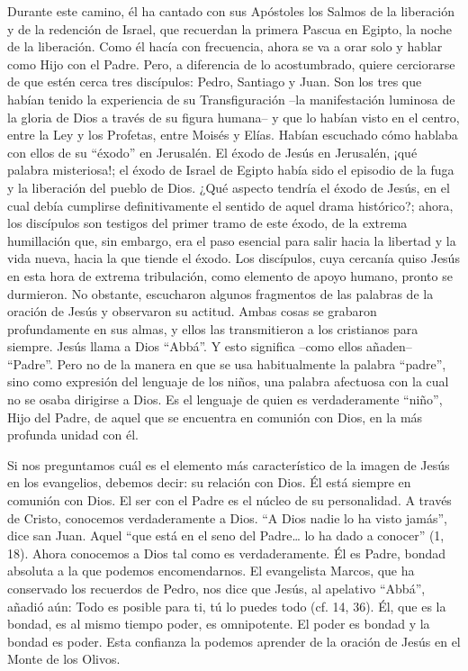 			\begin{body}Durante este camino, él ha cantado con sus Apóstoles los Salmos de la liberación y de la redención de Israel, que recuerdan la primera Pascua en Egipto, la noche de la liberación. Como él hacía con frecuencia, ahora se va a orar solo y hablar como Hijo con el Padre. Pero, a diferencia de lo acostumbrado, quiere cerciorarse de que estén cerca tres discípulos: Pedro, Santiago y Juan. Son los tres que habían tenido la experiencia de su Transfiguración –la manifestación luminosa de la gloria de Dios a través de su figura humana– y que lo habían visto en el centro, entre la Ley y los Profetas, entre Moisés y Elías. Habían escuchado cómo hablaba con ellos de su “éxodo” en Jerusalén. El éxodo de Jesús en Jerusalén, ¡qué palabra misteriosa!; el éxodo de Israel de Egipto había sido el episodio de la fuga y la liberación del pueblo de Dios. ¿Qué aspecto tendría el éxodo de Jesús, en el cual debía cumplirse definitivamente el sentido de aquel drama histórico?; ahora, los discípulos son testigos del primer tramo de este éxodo, de la extrema humillación que, sin embargo, era el paso esencial para salir hacia la libertad y la vida nueva, hacia la que tiende el éxodo. Los discípulos, cuya cercanía quiso Jesús en esta hora de extrema tribulación, como elemento de apoyo humano, pronto se durmieron. No obstante, escucharon algunos fragmentos de las palabras de la oración de Jesús y observaron su actitud. Ambas cosas se grabaron profundamente en sus almas, y ellos las transmitieron a los cristianos para siempre. Jesús llama a Dios “Abbá”. Y esto significa –como ellos añaden– “Padre”. Pero no de la manera en que se usa habitualmente la palabra “padre”, sino como expresión del lenguaje de los niños, una palabra afectuosa con la cual no se osaba dirigirse a Dios. Es el lenguaje de quien es verdaderamente “niño”, Hijo del Padre, de aquel que se encuentra en comunión con Dios, en la más profunda unidad con él.\end{body}
			
			\begin{body}Si nos preguntamos cuál es el elemento más característico de la imagen de Jesús en los evangelios, debemos decir: su relación con Dios. Él está siempre en comunión con Dios. El ser con el Padre es el núcleo de su personalidad. A través de Cristo, conocemos verdaderamente a Dios. “A Dios nadie lo ha visto jamás”, dice san Juan. Aquel “que está en el seno del Padre… lo ha dado a conocer” (1, 18). Ahora conocemos a Dios tal como es verdaderamente. Él es Padre, bondad absoluta a la que podemos encomendarnos. El evangelista Marcos, que ha conservado los recuerdos de Pedro, nos dice que Jesús, al apelativo “Abbá”, añadió aún: Todo es posible para ti, tú lo puedes todo (cf. 14, 36). Él, que es la bondad, es al mismo tiempo poder, es omnipotente. El poder es bondad y la bondad es poder. Esta confianza la podemos aprender de la oración de Jesús en el Monte de los Olivos.\end{body}
			
